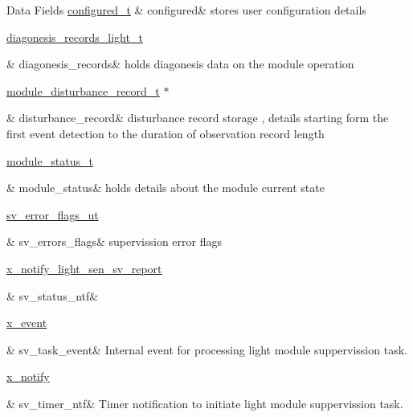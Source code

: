 \begin{DoxyFields}{Data Fields}
\hypertarget{a00024_a94b2d1f6ea4ab334c74d24984dd27843}{\hyperlink{a00021_d6/d9c/a00352}{configured\+\_\+t}}\label{a00024_a94b2d1f6ea4ab334c74d24984dd27843}
&
configured&
stores user configuration details \\
\hline

\hypertarget{a00024_a7ae905b560513ad201e58c2f63375030}{\hyperlink{a00017_dd/dcb/a00375}{diagonesis\+\_\+records\+\_\+light\+\_\+t}}\label{a00024_a7ae905b560513ad201e58c2f63375030}
&
diagonesis\+\_\+records&
holds diagonesis data on the module operation \\
\hline

\hypertarget{a00024_ac9b38e2c1d3f1013a88d33506c754152}{\hyperlink{a00028}{module\+\_\+disturbance\+\_\+record\+\_\+t} $\ast$}\label{a00024_ac9b38e2c1d3f1013a88d33506c754152}
&
disturbance\+\_\+record&
disturbance record storage , details starting form the first event detection to the duration of observation record length \\
\hline

\hypertarget{a00024_a5a53c391562b059eb744ac679f3765ca}{\hyperlink{a00017_de/d94/a00603}{module\+\_\+status\+\_\+t}}\label{a00024_a5a53c391562b059eb744ac679f3765ca}
&
module\+\_\+status&
holds details about the module current state \\
\hline

\hypertarget{a00024_aaeec6b0609dba31393f337abf1cce3d3}{\hyperlink{a00022_d2/d5a/a00792}{sv\+\_\+error\+\_\+flags\+\_\+ut}}\label{a00024_aaeec6b0609dba31393f337abf1cce3d3}
&
sv\+\_\+errors\+\_\+flags&
supervission error flags \\
\hline

\hypertarget{a00024_a35ce77844e6990e2537b2f11cd2d5cca}{\hyperlink{a00018_d0/d66/a00858}{x\+\_\+notify\+\_\+light\+\_\+sen\+\_\+sv\+\_\+report}}\label{a00024_a35ce77844e6990e2537b2f11cd2d5cca}
&
sv\+\_\+status\+\_\+ntf&
\\
\hline

\hypertarget{a00024_a43c345f39ea3aefbb60ef1ef57fe5d83}{\hyperlink{a00036_de/d37/a00849}{x\+\_\+event}}\label{a00024_a43c345f39ea3aefbb60ef1ef57fe5d83}
&
sv\+\_\+task\+\_\+event&
Internal event for processing light module suppervission task. \\
\hline

\hypertarget{a00024_ada91b200053f2d93e3639dc4ee3415b4}{\hyperlink{a00036_df/d4c/a00851}{x\+\_\+notify}}\label{a00024_ada91b200053f2d93e3639dc4ee3415b4}
&
sv\+\_\+timer\+\_\+ntf&
Timer notification to initiate light module suppervission task. \\
\hline

\end{DoxyFields}


